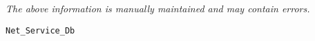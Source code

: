\label{pkg:net\_service\_db}

{\tiny \it The above information is manually maintained and may contain errors.}
\begin{verbatim}
Net_Service_Db
\end{verbatim}
